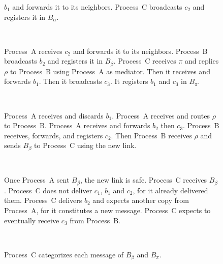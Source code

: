 \begin{figure*}
\begin{center}
\begin{subfigure}[t]{0.46\textwidth}
{        $b_1$ and forwards it to its neighbors. Process~C broadcasts $c_2$ and
        registers it in $B_\alpha$.}
    \end{subfigure}
    ~
    \begin{subfigure}[t]{0.51\textwidth}
      \caption{\label{fig:solveG}Process~A receives $c_2$ and forwards it to
        its neighbors.  Process~B broadcasts $b_2$ and registers it in
        $B_\beta$. Process~C receives $\pi$ and replies $\rho$ to Process~B
        using Process~A as mediator. Then it receives and forwards $b_1$. Then
        it broadcasts $c_3$. It registers $b_1$ and $c_3$ in $B_\pi$.}
    \end{subfigure}
    \\
    \begin{subfigure}[t]{0.44\textwidth}
      \caption{\label{fig:solveH}Process~A receives and discards $b_1$.
        Process~A receives and routes $\rho$ to Process~B.  Process~A receives
        and forwards $b_2$ then $c_3$. Process~B receives, forwards, and
        registers $c_2$. Then Process~B receives $\rho$ and sends $B_\beta$ to
        Process~C using the new link.}
    \end{subfigure}
    ~
    \begin{subfigure}[t]{0.53\textwidth}
      \caption{\label{fig:solveI}Once Process~A sent $B_\beta$, the new link is
        safe.  Process~C receives $B_\beta$. Process~C does not deliver $c_1$, $b_1$
        and $c_2$, for it already delivered them. Process~C delivers $b_2$ and
        expects another copy from Process~A, for it constitutes a new message.
        Process~C expects to eventually receive $c_3$ from Process~B.}
    \end{subfigure}
    \\
    \begin{subfigure}{1\textwidth}
      \begin{center}
      \caption{\label{fig:solveJ}Process~C categorizes each message of $B_\beta$
        and $B_\pi$.}%
      \end{center}
    \end{subfigure}%
    \caption{\label{fig:solve}Using buffers and control messages, \RPCBROADCAST 
      provides reliable causal broadcast.}
  \end{center}
\end{figure*}


